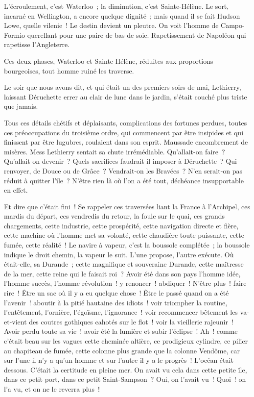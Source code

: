 \documentclass[french,twoside]{book} %
\begin{document}
L’écroulement, c’est Waterloo ; la diminution, c’est Sainte-Hélène. Le sort, incarné en Wellington, a encore quelque dignité ; mais quand il se fait Hudson Lowe, quelle vilenie ! Le destin devient un pleutre. On voit l’homme de Campo-Formio querellant pour une paire de bas de soie. Rapetissement de Napoléon qui rapetisse l’Angleterre.\par
Ces deux phases, Waterloo et Sainte-Hélène, réduites aux proportions bourgeoises, tout homme ruiné les traverse.\par
Le soir que nous avons dit, et qui était un des premiers soirs de mai, Lethierry, laissant Déruchette errer au clair de lune dans le jardin, s’était couché plus triste que jamais.\par
Tous ces détails chétifs et déplaisants, complications des fortunes perdues, toutes ces préoccupations du troisième ordre, qui commencent par être insipides et qui finissent par être lugubres, roulaient dans son esprit. Maussade encombrement de misères. Mess Lethierry sentait sa chute irrémédiable. Qu’allait-on faire ? Qu’allait-on devenir ? Quels sacrifices faudrait-il imposer à Déruchette ? Qui renvoyer, de Douce ou de Grâce ? Vendrait-on les Bravées ? N’en serait-on pas réduit à quitter l’île ? N’être rien là où l’on a été tout, déchéance insupportable en effet.\par
 Et dire que c’était fini ! Se rappeler ces traversées liant la France à l’Archipel, ces mardis du départ, ces vendredis du retour, la foule sur le quai, ces grands chargements, cette industrie, cette prospérité, cette navigation directe et fière, cette machine où l’homme met sa volonté, cette chaudière toute-puissante, cette fumée, cette réalité ! Le navire à vapeur, c’est la boussole complétée ; la boussole indique le droit chemin, la vapeur le suit. L’une propose, l’autre exécute. Où était-elle, sa Durande ; cette magnifique et souveraine Durande, cette maîtresse de la mer, cette reine qui le faisait roi ? Avoir été dans son pays l’homme idée, l’homme succès, l’homme révolution ! y renoncer ! abdiquer ! N’être plus ! faire rire ! Être un sac où il y a eu quelque chose ! Être le passé quand on a été l’avenir ! aboutir à la pitié hautaine des idiots ! voir triompher la routine, l’entêtement, l’ornière, l’égoïsme, l’ignorance ! voir recommencer bêtement les va-et-vient des coutres gothiques cahotés sur le flot ! voir la vieillerie rajeunir ! Avoir perdu toute sa vie ! avoir été la lumière et subir l’éclipse ! Ah ! comme c’était beau sur les vagues cette cheminée altière, ce prodigieux cylindre, ce pilier au chapiteau de fumée, cette colonne plus grande que la colonne Vendôme, car sur l’une il n’y a qu’un homme et sur l’autre il y a le progrès ! L’océan était dessous. C’était la certitude en pleine mer. On avait vu cela dans cette petite île, dans ce petit port, dans ce petit Saint-Sampson ? Oui, on l’avait vu ! Quoi ! on l’a vu, et on ne le reverra plus !\par
\end{document}
